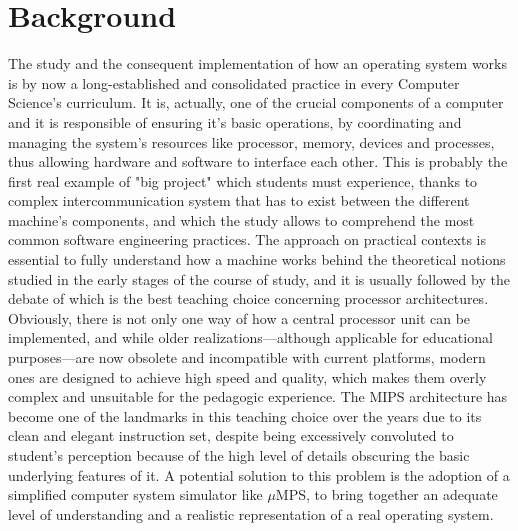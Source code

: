 \documentclass[12pt,a4paper,openright,twoside]{report}
\begin{document}
\section{Background}
	The study and the consequent implementation of how an operating system works is by now a long-established and consolidated practice in every Computer Science's curriculum.
	It is, actually, one of the crucial components of a computer and it is responsible of ensuring it's basic operations, by coordinating and managing the system's resources like processor, memory, devices and processes, thus allowing hardware and software to interface each other.
	This is probably the first real example of "big project" which students must experience, thanks to complex intercommunication system that has to exist between the different machine's components, and which the study allows to comprehend the most common software engineering practices.
	The approach on practical contexts is essential to fully understand how a machine works behind the theoretical notions studied in the early stages of the course of study, and it is usually followed by the debate of which is the best teaching choice concerning processor architectures.
	Obviously, there is not only one way of how a central processor unit can be implemented, and while older realizations---although applicable for educational purposes---are now obsolete and incompatible with current platforms, modern ones are designed to achieve high speed and quality, which makes them overly complex and unsuitable for the pedagogic experience.
	The MIPS architecture has become one of the landmarks in this teaching choice over the years due to its clean and elegant instruction set, despite being excessively convoluted to student’s perception because of the high level of details obscuring the basic underlying features of it.
	A potential solution to this problem is the adoption of a simplified computer system simulator like $\mu$MPS, to bring together an adequate level of understanding and a realistic representation of a real operating system.
\end{document}

